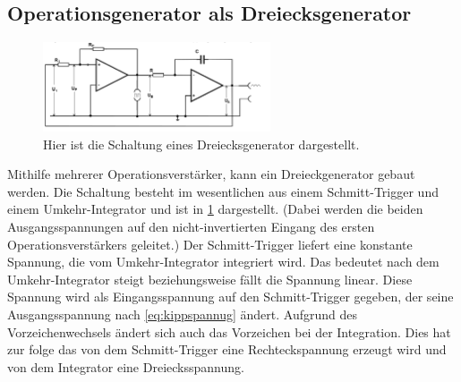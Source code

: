 \subsection{Operationsgenerator als Dreiecksgenerator}
\begin{figure}[h!]
	\centering
	\includegraphics[width = 0.6\textwidth]{../Grafiken/Dreieckgenerator.png}
	\caption{Hier ist die Schaltung eines Dreiecksgenerator dargestellt. \cite{V51} \label{fig:Dreieck}}
\end{figure}
\noindent
Mithilfe mehrerer Operationsverstärker, kann ein Dreieckgenerator gebaut werden.
Die Schaltung besteht im wesentlichen aus einem Schmitt-Trigger und einem Umkehr-Integrator und ist in \cref{fig:Dreieck} dargestellt.
(Dabei werden die beiden Ausgangsspannungen auf den nicht-invertierten Eingang des ersten Operationsverstärkers geleitet.)
Der Schmitt-Trigger liefert eine konstante Spannung, die vom Umkehr-Integrator integriert wird.
Das bedeutet nach dem Umkehr-Integrator steigt beziehungsweise fällt die Spannung linear. 
Diese Spannung wird als Eingangsspannung auf den Schmitt-Trigger gegeben, der seine Ausgangsspannung nach \cref{eq:kippspannug} ändert.
Aufgrund des Vorzeichenwechsels ändert sich auch das Vorzeichen bei der Integration.
Dies hat zur folge das von dem Schmitt-Trigger eine Rechteckspannung erzeugt wird und von dem Integrator eine Dreiecksspannung.

